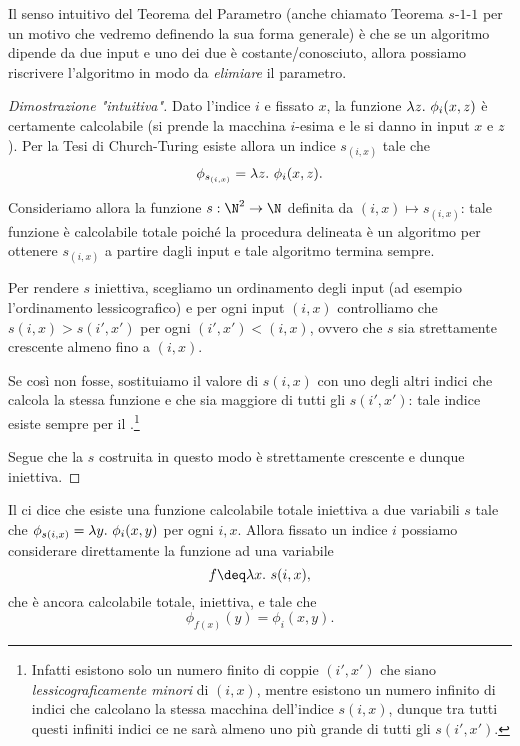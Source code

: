 Il senso intuitivo del Teorema del Parametro (anche chiamato Teorema $s$-$1$-$1$ per un motivo che vedremo definendo la sua forma generale) è che se un algoritmo dipende da due input e uno dei due è costante/conosciuto, allora possiamo riscrivere l'algoritmo in modo da \emph{elimiare} il parametro.

\begin{proof}
    [Dimostrazione "intuitiva"]
    Dato l'indice $i$ e fissato $x$, la funzione $\lambda{z}.\ {\phi_i(x, z)}$ è certamente calcolabile (si prende la macchina $i$-esima e le si danno in input $x$ e $z$). Per la Tesi di Church-Turing esiste allora un indice $s_{(i, x)}$ tale che \[
        \phi_{s_{(i, x)}} = \lambda{z}.\ {\phi_i(x, z)}.
    \] 

    Consideriamo allora la funzione $s : \N^2 \to \N$ definita da $(i, x) \mapsto s_{(i, x)}$: tale funzione è calcolabile totale poiché la procedura delineata è un algoritmo per ottenere $s_{(i, x)}$ a partire dagli input e tale algoritmo termina sempre.

    Per rendere $s$ iniettiva, scegliamo un ordinamento degli input (ad esempio l'ordinamento lessicografico) e per ogni input $(i, x)$ controlliamo che $s(i, x) > s(i', x')$ per ogni $(i', x') < (i, x)$, ovvero che $s$ sia strettamente crescente almeno fino a $(i, x)$.
    
    Se così non fosse, sostituiamo il valore di $s(i, x)$ con uno degli altri indici che calcola la stessa funzione e che sia maggiore di tutti gli $s(i', x')$: tale indice esiste sempre per il .\footnote{Infatti esistono solo un numero finito di coppie $(i', x')$ che siano \emph{lessicograficamente minori} di $(i, x)$, mentre esistono un numero infinito di indici che calcolano la stessa macchina dell'indice $s(i, x)$, dunque tra tutti questi infiniti indici ce ne sarà almeno uno più grande di tutti gli $s(i', x')$.}
    
    Segue che la $s$ costruita in questo modo è strettamente crescente e dunque iniettiva.
\end{proof}

\begin{remark}
    Il  ci dice che esiste una funzione calcolabile totale iniettiva a due variabili $s$ tale che $\phi_{s(i, x)} = \lambda{y}.\ {\phi_i(x, y)}$ per ogni $i, x$. Allora fissato un indice $i$ possiamo considerare direttamente la funzione ad una variabile \[
        f \deq \lam{x}{s(i, x)},
    \] che è ancora calcolabile totale, iniettiva, e tale che \[
        \phi_{f(x)}(y) = \phi_i(x, y).
    \]
\end{remark}

